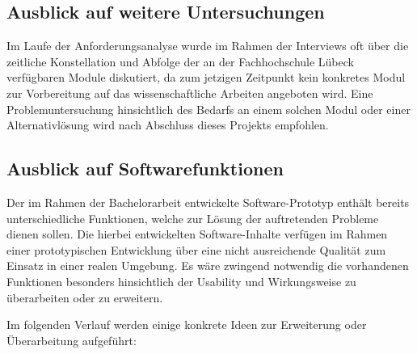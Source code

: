 \documentclass[bibliography=totoc,listof=totoc,BCOR=5mm,DIV=12,oneside]{scrbook}
\begin{document}
\subsection{Ausblick auf weitere Untersuchungen}
\par Im Laufe der Anforderungsanalyse wurde im Rahmen der Interviews oft über die zeitliche Konstellation und Abfolge der an der Fachhochschule Lübeck verfügbaren Module diskutiert, da zum jetzigen Zeitpunkt kein konkretes Modul zur Vorbereitung auf das wissenschaftliche Arbeiten angeboten wird. Eine Problemuntersuchung hinsichtlich des Bedarfs an einem solchen Modul oder einer Alternativlösung wird nach Abschluss dieses Projekts empfohlen.

\subsection{Ausblick auf Softwarefunktionen}
\par Der im Rahmen der Bachelorarbeit entwickelte Software-Prototyp enthält bereits unterschiedliche Funktionen, welche zur Lösung der auftretenden Probleme dienen sollen. Die hierbei entwickelten Software-Inhalte verfügen im Rahmen einer prototypischen Entwicklung über eine nicht ausreichende Qualität zum Einsatz in einer realen Umgebung. Es wäre zwingend notwendig die vorhandenen Funktionen besonders hinsichtlich der Usability und Wirkungsweise zu überarbeiten oder zu erweitern. 

\par \bigskip Im folgenden Verlauf werden einige konkrete Ideen zur Erweiterung oder Überarbeitung aufgeführt:
\end{document}
